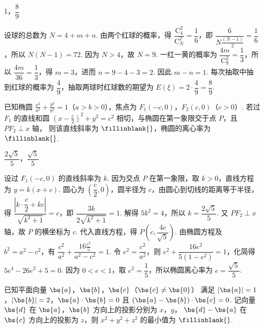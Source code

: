 \begin{answer}
1，\(\dfrac{8}{9}\)
\end{answer}

\begin{solution}
设球的总数为 \(N=4+m+n\). 由两个红球的概率，得
\(\dfrac{\mathrm C_{4}^{2}}{\mathrm C_{N}^{2}}=\dfrac16\)，即 \(\dfrac6{N\frac{(N-1)}{2}}=\dfrac16\)，所以 \(N(N-1)=72\). 因为 \(N>4\)，故 \(N=9\).
一红一黄的概率为
\(\dfrac{4m}{\mathrm C_{9}^{2}}=\dfrac13\)，所以 \(\dfrac{4m}{36}=\dfrac13\)，得 \(m=3\)，进而 \(n=9-4-3=2\). 因此 \(m-n=1\).
每次抽取中抽到红球的概率为 \(\dfrac49\)，抽取两球时红球数的期望为
\(E(\xi)=2\cdot\dfrac49=\dfrac89\).
\end{solution}

\begin{problem}
已知椭圆 \(\frac{x^2}{a^2}+\frac{y^2}{b^2}=1\)（\(a>b>0\)），焦点为
\(F_1(-c,0)\)，\(F_2(c,0)\)（\(c>0\)）.
若过 \(F_1\) 的直线和圆
\((x-\frac{c}{2})^2+y^2=c^2\) 相切，与椭圆在第一象限交于点 \(P\)，且 \(PF_2\perp x\) 轴，
则该直线斜率为 \(\fillinblank{}\)，椭圆的离心率为 \(\fillinblank{}\).

\end{problem}

\begin{answer}
\(\dfrac{2\sqrt{5}}{5}\)，\(\dfrac{\sqrt{5}}{5}\)
\end{answer}

\begin{solution}
设过 \(F_{1}(-c,0)\) 的直线斜率为 \(k\). 因为交点 \(P\) 在第一象限，取 \(k>0\)，直线方程为 \(y=k(x+c)\). 圆心为 \(\left(\dfrac c2,0\right)\)，圆半径为 \(c\)，由圆心到切线的距离等于半径，得
\(\dfrac{\left|k\cdot\dfrac c2+kc\right|}{\sqrt{k^{2}+1}}=c\)，即 \(\dfrac{3k}{2\sqrt{k^{2}+1}}=1\). 解得 \(5k^{2}=4\)，所以 \(k=\dfrac{2\sqrt5}{5}\).
又 \(PF_{2}\perp x\) 轴，故 \(P\) 的横坐标为 \(c\). 代入直线方程，得 \(P\left(c,\dfrac{4c}{\sqrt5}\right)\). 由椭圆方程及 \(b^{2}=a^{2}-c^{2}\)，有
\(\dfrac{c^{2}}{a^{2}}+\dfrac{16\frac{c^{2}}{5}}{a^{2}-c^{2}}=1\). 令 \(e^{2}=\dfrac{c^{2}}{a^{2}}\)，则
\(e^{2}+\dfrac{16e^{2}}{5(1-e^{2})}=1\)，化简得 \(5e^{4}-26e^{2}+5=0\). 因为 \(0<e<1\)，取 \(e^{2}=\dfrac15\)，所以椭圆离心率为 \(e=\dfrac{\sqrt5}{5}\).
\end{solution}

\begin{problem}
已知平面向量 \(\bs{a}\)，\(\bs{b}\)，\(\bs{c}\)（\(\bs{c}\ne\bs{0}\)）
满足 \(|\bs{a}|=1\)，\(|\bs{b}|=2\)，\(\bs{a}\cdot\bs{b}=0\) 且 \((\bs{a}-\bs{b})\cdot\bs{c}=0\).
记向量 \(\bs{d}\) 在 \(\bs{a}\)，\(\bs{b}\) 方向上的投影分别为 \(x\)，\(y\)，
\(\bs{d}-\bs{a}\) 在 \(\bs{c}\) 方向上的投影为 \(z\)，则
\(x^2+y^2+z^2\) 的最小值为 \(\fillinblank{}\).
\end{problem}

